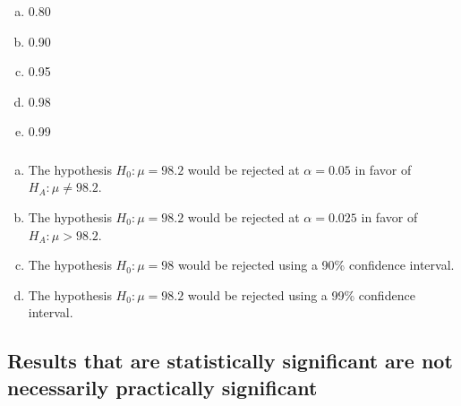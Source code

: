 \documentclass[11pt,containsverbatim,handout,xcolor=xelatex,dvipsnames,table]{beamer}
\newcommand{\solnMult}[1]{#1}
\begin{document}

\begin{frame}
\frametitle{}


\begin{enumerate}[(a)]
\item 0.80
\item 0.90
\item 0.95
\item \solnMult{0.98}
\item 0.99
\end{enumerate}

\end{frame}


\begin{frame}
\frametitle{}


\begin{enumerate}[(a)]
\item The hypothesis $H_0: \mu = 98.2$ would be rejected at $\alpha = 0.05$ in favor of $H_A: \mu \ne 98.2$.
\item The hypothesis $H_0: \mu = 98.2$ would be rejected at $\alpha = 0.025$ in favor of $H_A: \mu > 98.2$.
\item \solnMult{The hypothesis $H_0: \mu = 98$ would be rejected using a 90\% confidence interval.}
\item The hypothesis $H_0: \mu = 98.2$ would be rejected using a 99\% confidence interval.
\end{enumerate}

\end{frame}


\subsection{Results that are statistically significant are not necessarily practically significant}
\label{mi2dec}

\end{document}
